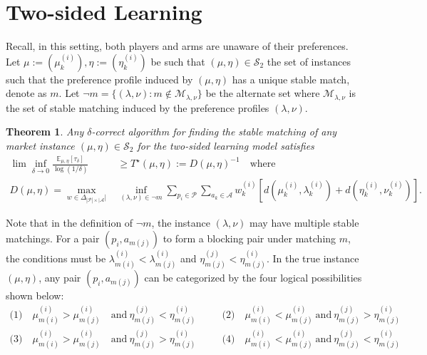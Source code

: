 \documentclass{article}
\newcommand{\E}{\mathbb{E}}
\newtheorem{theorem}{Theorem}
\begin{document}
\section{Two-sided Learning}\label{sec:two_sided}
Recall, in this setting, both players and arms are unaware of their preferences. Let $\mu:=(\mu^{(i)}_k),\eta:=(\eta^{(i)}_k)$ be such that $(\mu,\eta)\in \mathcal{S}_2$ the set of instances such that the preference profile induced by $(\mu,\eta)$ has a unique stable match, denote as $m$. Let $\neg m=\{(\lambda,\nu):m\not\in {\mathcal{M}}_{\lambda,\nu}\}$ be the alternate set where $\mathcal{M}_{\lambda,\nu}$ is the set of stable matching induced by the preference profiles $(\lambda,\nu)$. 
\begin{theorem}
    Any $\delta$-correct algorithm for finding the stable matching of any market instance $(\mu,\eta)\in\mathcal{S}_2$ for the two-sided learning model satisfies
    \begin{align*}
    \lim\inf_{\delta\to 0}\frac{\E_{\mu,\eta}[\tau_{\delta}]}{\log(1/\delta)}&\geq T^{\star}(\mu,\eta):=D(\mu,\eta)^{-1}\quad \text{where}\\
        D(\mu,\eta) = \max_{w\in\Delta_{|\mathcal{P}|\times|\mathcal{A}}|}&\inf_{(\lambda,\nu)\in\neg m}\sum_{p_i\in\mathcal{P}}\sum_{a_k\in\mathcal{A}} w^{(i)}_k \left[d(\mu^{(i)}_k,\lambda^{(i)}_k)+d(\eta^{(i)}_k,\nu^{(i)}_k)\right].
    \end{align*}
\end{theorem}
Note that in the definition of $\neg m$, the instance $(\lambda,\nu)$ may have multiple stable matchings. For a pair $(p_i,a_{m(j)})$ to form a blocking pair under matching $m$, the conditions must be $\lambda^{(i)}_{m(i)} < \lambda^{(i)}_{m(j)}$ and $\eta^{(j)}_{m(j)} < \eta^{(i)}_{m(j)}$. In the true instance $(\mu,\eta)$, any pair $(p_i,a_{m(j)})$ can be categorized by the four logical possibilities shown below:
\begin{align*}
    \text{(1)} \quad \mu^{(i)}_{m(i)} > \mu^{(i)}_{m(j)} \ &\text{and} \  \eta^{(j)}_{m(j)} < \eta^{(i)}_{m(j)} \quad &&\text{(2)} \quad \mu^{(i)}_{m(i)} < \mu^{(i)}_{m(j)} \ \text{and} \  \eta^{(j)}_{m(j)} > \eta^{(i)}_{m(j)} \\
    \text{(3)} \quad \mu^{(i)}_{m(i)} > \mu^{(i)}_{m(j)} \ &\text{and} \  \eta^{(j)}_{m(j)} > \eta^{(i)}_{m(j)} \quad &&\text{(4)} \quad \mu^{(i)}_{m(i)} < \mu^{(i)}_{m(j)} \ \text{and} \  \eta^{(j)}_{m(j)} < \eta^{(i)}_{m(j)}
\end{align*}
\end{document}
